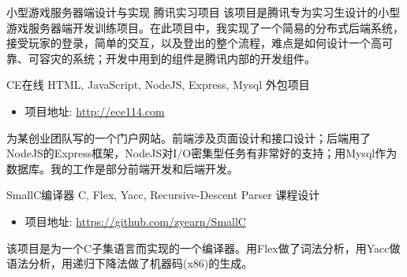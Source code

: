 \documentclass[11pt,a4paper]{moderncv}
\begin{document}
{小型游戏服务器端设计与实现}
{腾讯实习项目}
{}
{}
{
该项目是腾讯专为实习生设计的小型游戏服务器端开发训练项目。在此项目中，我实现了一个简易的分布式后端系统，接受玩家的登录，简单的交互，以及登出的整个流程，难点是如何设计一个高可靠、可容灾的系统；开发中用到的组件是腾讯内部的开发组件。
}
\vspace*{0.2\baselineskip}

{CE在线}
{HTML, JavaScript, NodeJS, Express, Mysql}
{外包项目}
{}
{
\begin{itemize}
    \item 项目地址: \url{http://ece114.com}
\end{itemize}
为某创业团队写的一个门户网站。前端涉及页面设计和接口设计；后端用了NodeJS的Express框架，NodeJS对I/O密集型任务有非常好的支持；用Mysql作为数据库。我的工作是部分前端开发和后端开发。\\
}
\vspace*{0.2\baselineskip}




{SmallC编译器}
{C, Flex, Yacc, Recursive-Descent Parser}
{课程设计}
{}
{
\begin{itemize}
    \item 项目地址: \url{https://github.com/zyearn/SmallC}
\end{itemize}
该项目是为一个C子集语言而实现的一个编译器。用Flex做了词法分析，用Yacc做语法分析，用递归下降法做了机器码(x86)的生成。\\
}
\vspace*{0.2\baselineskip}
\end{document}
